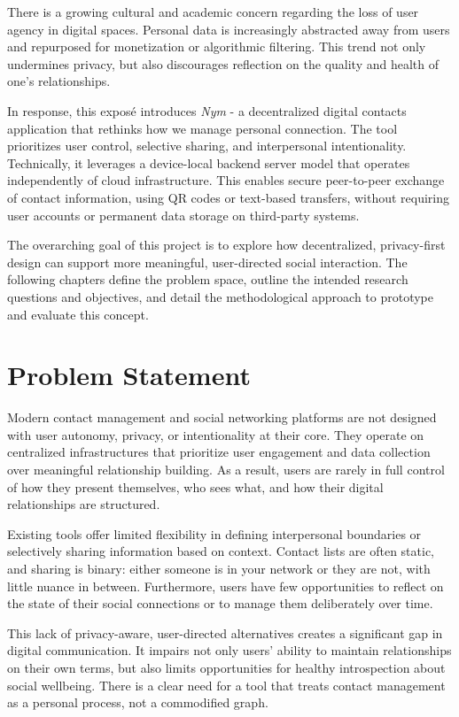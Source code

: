 \documentclass{imc-inf}
\begin{document}
There is a growing cultural and academic concern regarding the loss of user agency in digital spaces. Personal data is increasingly abstracted away from users and repurposed for monetization or algorithmic filtering. This trend not only undermines privacy, but also discourages reflection on the quality and health of one's relationships.

In response, this exposé introduces \textit{Nym} - a decentralized digital contacts application that rethinks how we manage personal connection. The tool prioritizes user control, selective sharing, and interpersonal intentionality. Technically, it leverages a device-local backend server model that operates independently of cloud infrastructure. This enables secure peer-to-peer exchange of contact information, using QR codes or text-based transfers, without requiring user accounts or permanent data storage on third-party systems.

The overarching goal of this project is to explore how decentralized, privacy-first design can support more meaningful, user-directed social interaction. The following chapters define the problem space, outline the intended research questions and objectives, and detail the methodological approach to prototype and evaluate this concept.

\chapter{Problem Statement}

Modern contact management and social networking platforms are not designed with user autonomy, privacy, or intentionality at their core. They operate on centralized infrastructures that prioritize user engagement and data collection over meaningful relationship building. As a result, users are rarely in full control of how they present themselves, who sees what, and how their digital relationships are structured.

Existing tools offer limited flexibility in defining interpersonal boundaries or selectively sharing information based on context. Contact lists are often static, and sharing is binary: either someone is in your network or they are not, with little nuance in between. Furthermore, users have few opportunities to reflect on the state of their social connections or to manage them deliberately over time.

This lack of privacy-aware, user-directed alternatives creates a significant gap in digital communication. It impairs not only users’ ability to maintain relationships on their own terms, but also limits opportunities for healthy introspection about social wellbeing. There is a clear need for a tool that treats contact management as a personal process, not a commodified graph.
\end{document}
